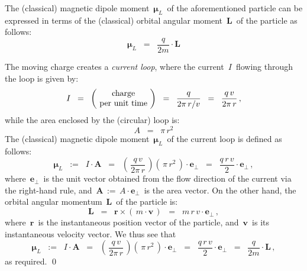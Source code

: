 \vskip 0.5cm
\begin{lemma}
\mbox{}
\vskip 0.02cm
\noindent
The (classical) magnetic dipole moment
\,$\boldsymbol{\mu}_{L}$\,
of the aforementioned particle can be expressed
in terms of the (classical) orbital angular moment \,$\mathbf{L}$\,
of the particle as follows:
\begin{equation*}
\boldsymbol{\mu}_{L}
\;\; = \;\;
    \dfrac{q}{2m}
    \cdot
    \mathbf{L}
\end{equation*}
\end{lemma}
\proof
The moving charge creates a \textit{current loop},
where the current \,$I$\, flowing through the loop is given by:
\begin{equation*}
I
\;\; = \;\;
    \left(\!\begin{array}{c}
        \textnormal{charge}
        \\
        \textnormal{per unit time}
        \end{array}\!\right)
\;\; = \;\;
    \dfrac{q}{2\pi\,r/v}
\;\; = \;\;
    \dfrac{q\,v}{2\pi\,r}\,,
\end{equation*}
while the area enclosed by the (circular) loop is:
\begin{equation*}
A
\;\; = \;\;
    \pi \, r^{2}
\end{equation*}
The (classical) magnetic dipole moment
\,$\boldsymbol{\mu}_{L}$\,
of the current loop is defined as follows:
\begin{equation*}
\boldsymbol{\mu}_{L}
\;\; := \;\;
    I \cdot \boldsymbol{A}
\;\; = \;\;
    \left(\,\dfrac{q\,v}{2\pi\,r}\,\right)
    \left(\,\pi \, r^{2}\,\right)
    \cdot
    \mathbf{e}_{\perp}
\;\; = \;\;
    \dfrac{q\,r\,v}{2}
    \cdot
    \mathbf{e}_{\perp}\,,
\end{equation*}
where
\,$\mathbf{e}_{\perp}$\,
is the unit vector obtained from the flow direction of the current via the right-hand rule, and
\,$\mathbf{A} \,:=\, A \cdot \mathbf{e}_{\perp}$\, is the area vector.
On the other hand, the orbital angular momentum \,$\mathbf{L}$\,
of the particle is:
\begin{equation*}
\mathbf{L}
\;\; = \;\;
    \mathbf{r}
    \times
    \left(\,m\cdot\mathbf{v}\,\right)
\;\; = \;\;
    m\,r\,v
    \cdot
    \mathbf{e}_{\perp}\,,
\end{equation*}
where
\,$\mathbf{r}$\,
is the instantaneous position vector of the particle,
and
\,$\mathbf{v}$\,
is its instantaneous velocity vector.
We thus see that
\begin{equation*}
\boldsymbol{\mu}_{L}
\;\; := \;\;
    I \cdot \boldsymbol{A}
\;\; = \;\;
    \left(\,\dfrac{q\,v}{2\pi\,r}\,\right)
    \left(\,\pi \, r^{2}\,\right)
    \cdot
    \mathbf{e}_{\perp}
\;\; = \;\;
    \dfrac{q\,r\,v}{2}
    \cdot
    \mathbf{e}_{\perp}
\;\; = \;\;
    \dfrac{q}{2m}
    \cdot
    \mathbf{L}\,,
\end{equation*}
as required.
\qed

